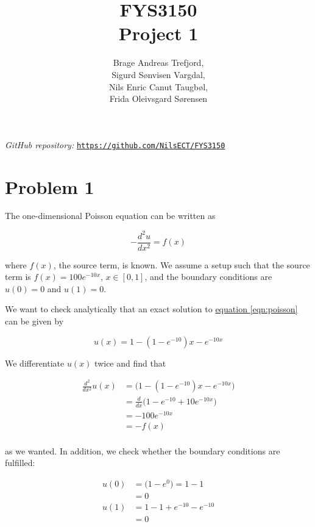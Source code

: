 \documentclass[english,notitlepage]{article}  %
\begin{document}
\title{FYS3150\\Project 1}
\author{Brage Andreas Trefjord,\\Sigurd Sønvisen Vargdal,\\Nils Enric Canut Taugbøl,\\Frida Oleivsgard Sørensen}
\maketitle

\textit{GitHub repository:} \texttt{\url{https://github.com/NilsECT/FYS3150}}

\section*{Problem 1}

  The one-dimensional Poisson equation can be written as

  \begin{equation}
    -\frac{d^2 u}{dx^2} = f(x) \label{eqn:poisson}
  \end{equation}

  where $f(x)$, the source term, is known. We assume a setup such that the source term is $f(x) = 100e^{-10x}$, $x \in [0, 1]$, and the boundary conditions are $u(0) = 0$ and $u(1)=0$.


  We want to check analytically that an exact solution to \hyperref[eqn:poisson]{equation \ref*{eqn:poisson}} can be given by

  \begin{equation}
    u(x) = 1 - (1-e^{-10})x - e^{-10x} \label{eqn:u(x)}
  \end{equation}

  We differentiate $u(x)$ twice and find that

  \begin{equation}
    \begin{split}
      \frac{d^2}{dx^2} u(x) &= \bigg( 1 - (1-e^{-10} ) x - e^{-10x} \bigg) \\
      &=  \frac{d}{dx} \bigg( 1-e^{-10} + 10 e^{-10x} \bigg) \\
      &=  - 100 e^{-10x} \\
      &= -f(x) \\
    \end{split}
  \end{equation}

  as we wanted. In addition, we check whether the boundary conditions are fulfilled:

  \begin{equation}
    \begin{split}
      u(0) &= \big( 1 - e^0 \big) = 1-1 \\
      &= 0 \\
      u(1) &= 1-1+e^{-10} - e^{-10} \\
      &= 0 \\
    \end{split}
  \end{equation}
\end{document}
